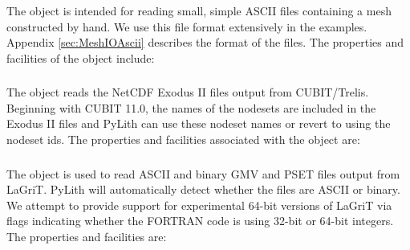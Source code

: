 
\subsubsection{}

The  object is intended for reading small, simple
ASCII files containing a mesh constructed by hand. We use this file
format extensively in the examples. Appendix \vref{sec:MeshIOAscii}
describes the format of the files. The properties and facilities of
the  object include:
\begin{inventory}
\end{inventory}

\subsubsection{}
\label{sec:MeshIOCubit}

The  object reads the NetCDF Exodus II files output from
CUBIT/Trelis. Beginning with CUBIT 11.0, the names of the nodesets are included
in the Exodus II files and PyLith can use these nodeset names or revert
to using the nodeset ids. The properties and facilities associated
with the  object are:
\begin{inventory}
\end{inventory}

\subsubsection{}
\label{sec:MeshIOLagrit}

The  object is used to read ASCII and binary GMV and PSET
files output from LaGriT. PyLith will automatically detect whether
the files are ASCII or binary. We attempt to provide support for experimental
64-bit versions of LaGriT via flags indicating whether the FORTRAN
code is using 32-bit or 64-bit integers. The  properties
and facilities are:
\begin{inventory}
\end{inventory}

